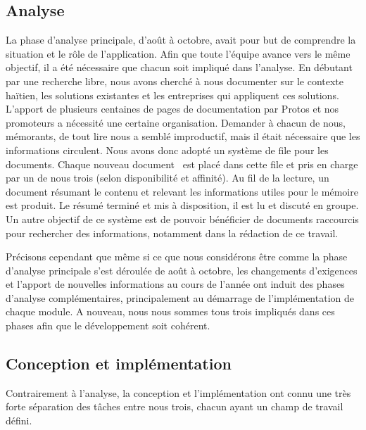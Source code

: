 \documentclass{EPL-master-thesis-covers-FR}
\begin{document}
			\subsection*{Analyse}

				La phase d'analyse principale, d'août à octobre, avait pour but de comprendre la situation et le rôle de l'application. Afin que toute l'équipe avance vers le même objectif, il a été nécessaire que chacun soit impliqué dans l'analyse. En débutant par une recherche libre, nous avons cherché à nous documenter sur le contexte haïtien, les solutions existantes et les entreprises qui appliquent ces solutions. L'apport de plusieurs centaines de pages de documentation par Protos et nos promoteurs a nécessité une certaine organisation. Demander à chacun de nous, mémorants, de tout lire nous a semblé improductif, mais il était nécessaire que les informations circulent. Nous avons donc adopté un système de file pour les documents. Chaque nouveau document~\cite{ref:resumes_documents} est placé dans cette file et pris en charge par un de nous trois (selon disponibilité et affinité). Au fil de la lecture, un document résumant le contenu et relevant les informations utiles pour le mémoire est produit. Le résumé terminé et mis à disposition, il est lu et discuté en groupe. Un autre objectif de ce système est de pouvoir bénéficier de documents raccourcis pour rechercher des informations, notamment dans la rédaction de ce travail.

				Précisons cependant que même si ce que nous considérons être comme la phase d'analyse principale s'est déroulée de août à octobre, les changements d'exigences et l'apport de nouvelles informations au cours de l'année ont induit des phases d'analyse complémentaires, principalement au démarrage de l'implémentation de chaque module. A nouveau, nous nous sommes tous trois impliqués dans ces phases afin que le développement soit cohérent.

			\subsection*{Conception et implémentation}

				Contrairement à l'analyse, la conception et l'implémentation ont connu une très forte séparation des tâches entre nous trois, chacun ayant un champ de travail défini.
\end{document}
